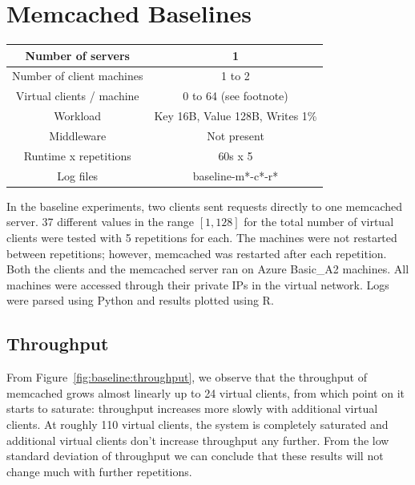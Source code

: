 \documentclass[11pt]{article}
\begin{document}
\section{Memcached Baselines}\label{sec:baseline}

\begin{center}
\small{
\smallskip
\begin{tabular}{|c|c|}
\hline Number of servers & 1 \\ 
\hline Number of client machines & 1 to 2 \\ 
\hline Virtual clients / machine & 0 to 64 (see footnote\footnotemark)\\ 
\hline Workload & Key 16B, Value 128B, Writes 1\% \\
\hline Middleware & Not present \\ 
\hline Runtime x repetitions & 60s x 5 \\ 
\hline Log files & baseline-m*-c*-r* \\
\hline 
\end{tabular} }
\end{center}

In the baseline experiments, two clients sent requests directly to one memcached server. 37 different values in the range $[1, 128]$ for the total number of virtual clients were tested with 5 repetitions for each. The machines were not restarted between repetitions; however, memcached was restarted after each repetition. Both the clients and the memcached server ran on Azure Basic\_A2 machines. All machines were accessed through their private IPs in the virtual network. Logs were parsed using Python and results plotted using R.



\subsection{Throughput}\label{sec:baseline:tput}

From Figure~\ref{fig:baseline:throughput}, we observe that the throughput of memcached grows almost linearly up to 24 virtual clients, from which point on it starts to saturate: throughput increases more slowly with additional virtual clients. At roughly 110 virtual clients, the system is completely saturated and additional virtual clients don't increase throughput any further. From the low standard deviation of throughput we can conclude that these results will not change much with further repetitions.
\end{document}
